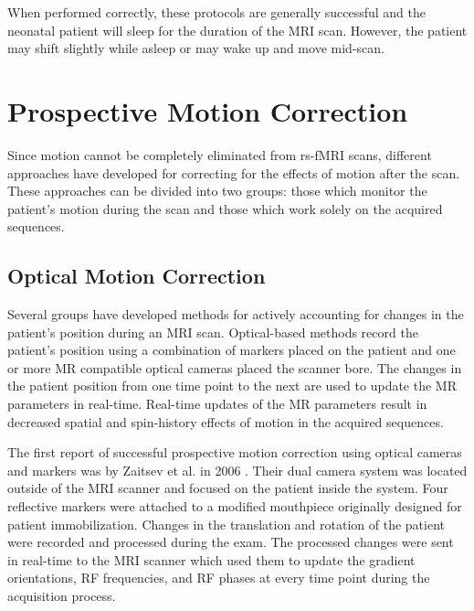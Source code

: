 When performed correctly, these protocols are generally successful and the neonatal patient will sleep for the duration of the MRI scan. However, the patient may shift slightly while asleep or may wake up and move mid-scan.


\section{Prospective Motion Correction}

Since motion cannot be completely eliminated from rs-fMRI scans, different approaches have developed for correcting for the effects of motion after the scan. These approaches can be divided into two groups: those which monitor the patient's motion during the scan and those which work solely on the acquired sequences.

\subsection{Optical Motion Correction}

Several groups have developed methods for actively accounting for changes in the patient's position during an MRI scan. Optical-based methods record the patient's position using a combination of markers placed on the patient and one or more MR compatible optical cameras placed the scanner bore. The changes in the patient position from one time point to the next are used to update the MR parameters in real-time. Real-time updates of the MR parameters result in decreased spatial and spin-history effects of motion in the acquired sequences.

The first report of successful prospective motion correction using optical cameras and markers was by Zaitsev et al. in 2006 \cite{Zaitsev2006}. Their dual camera system was located outside of the MRI scanner and focused on the patient inside the system. Four reflective markers were attached to a modified mouthpiece originally designed for patient immobilization. Changes in the translation and rotation of the patient were recorded and processed during the exam. The processed changes were sent in real-time to the MRI scanner which used them to update the gradient orientations, RF frequencies, and RF phases at every time point during the acquisition process.


